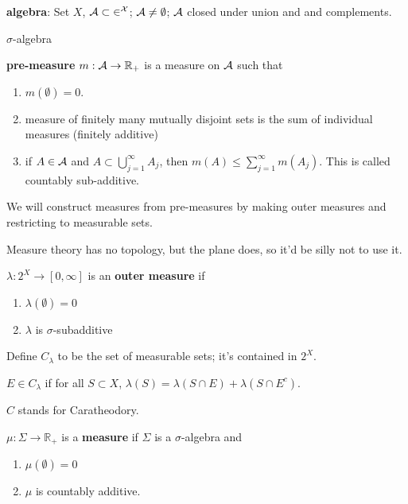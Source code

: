 \documentclass[11pt]{article}
\newenvironment{defn}[1][Definition]{\begin{trivlist}
\item[\hskip \labelsep {\bfseries #1}]}{\end{trivlist}}
\newcommand{\ra}{\rightarrow}
\newcommand{\sbs}{\subset}
\newcommand{\es}{\emptyset}
\newcommand{\si}{\sigma}
\newcommand{\la}{\lambda}
\newcommand{\su}[2]{\sum_{#1}^{#2}}
\newcommand{\bcu}[2]{\bigcup_{#1}^{#2}}
\newcommand{\re}{\mathbb{R}}
\begin{document}
\begin{defn}
{\bf algebra}: Set $X$, $\cal{A}\sbs 2^X$; $\cal{A}\neq\emptyset$; $\cal{A}$ closed under union and and complements. 
\end{defn}

\begin{defn}
$\si$-algebra
\end{defn}

\begin{defn}
{\bf pre-measure} $m:\cal{A}\ra\re_+$ is a measure on $\cal{A}$ such that
\begin{enumerate}
\item $m(\es)=0$.
\item measure of finitely many mutually disjoint sets is the sum of individual measures (finitely additive)
\item if $A\in\cal{A}$ and $A\sbs\bcu{j=1}{\infty}A_j$, then $m(A)\le\su{j=1}{\infty}m(A_j)$. This is called countably sub-additive. 
\end{enumerate}
\end{defn}

We will construct measures from pre-measures by making outer measures and restricting to measurable sets. 

Measure theory has no topology, but the plane does, so it'd be silly not to use it.

\begin{defn}
$\lambda:2^X\ra[0,\infty]$ is an {\bf outer measure} if 
\begin{enumerate}
\item $\la(\es)=0$
\item $\la$ is $\si$-subadditive
\end{enumerate}
\end{defn}

\begin{defn}
Define $C_{\la}$ to be the set of measurable sets; it's contained in $2^X$. 

$E\in C_{\la}$ if for all $S\sbs X$, $\la(S)=\la(S\cap E)+\la(S\cap E^c)$.

\end{defn}

$C$ stands for Caratheodory.

\begin{defn}
$\mu:\Sigma\ra\re_+$ is a {\bf measure} if $\Sigma$ is a $\si$-algebra and
\begin{enumerate}
\item $\mu(\es)=0$
\item $\mu$ is countably additive.
\end{enumerate}
\end{defn}
\end{document}
